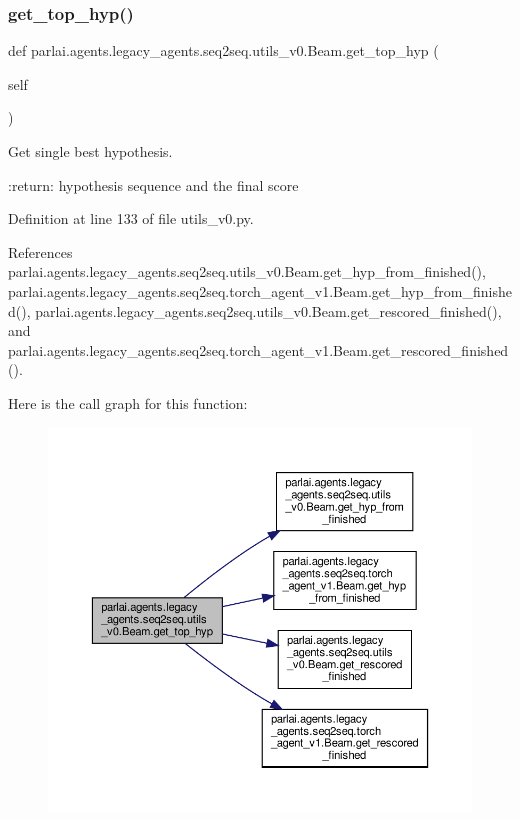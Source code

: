 \subsubsection{\texorpdfstring{get\+\_\+top\+\_\+hyp()}{get\_top\_hyp()}}
{\footnotesize\ttfamily def parlai.\+agents.\+legacy\+\_\+agents.\+seq2seq.\+utils\+\_\+v0.\+Beam.\+get\+\_\+top\+\_\+hyp (\begin{DoxyParamCaption}\item[{}]{self }\end{DoxyParamCaption})}

\begin{DoxyVerb}Get single best hypothesis.

:return: hypothesis sequence and the final score
\end{DoxyVerb}
 

Definition at line 133 of file utils\+\_\+v0.\+py.



References parlai.\+agents.\+legacy\+\_\+agents.\+seq2seq.\+utils\+\_\+v0.\+Beam.\+get\+\_\+hyp\+\_\+from\+\_\+finished(), parlai.\+agents.\+legacy\+\_\+agents.\+seq2seq.\+torch\+\_\+agent\+\_\+v1.\+Beam.\+get\+\_\+hyp\+\_\+from\+\_\+finished(), parlai.\+agents.\+legacy\+\_\+agents.\+seq2seq.\+utils\+\_\+v0.\+Beam.\+get\+\_\+rescored\+\_\+finished(), and parlai.\+agents.\+legacy\+\_\+agents.\+seq2seq.\+torch\+\_\+agent\+\_\+v1.\+Beam.\+get\+\_\+rescored\+\_\+finished().

Here is the call graph for this function\+:
\nopagebreak
\begin{figure}[H]
\begin{center}
\leavevmode
\includegraphics[width=350pt]{classparlai_1_1agents_1_1legacy__agents_1_1seq2seq_1_1utils__v0_1_1Beam_abbb522afdc69dbce77f997dd392c5c1d_cgraph}
\end{center}
\end{figure}


